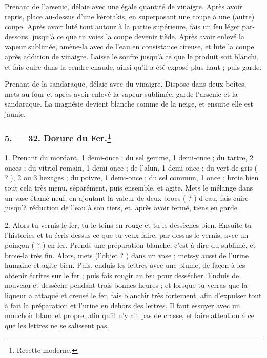 \documentclass[a4paper, 11pt, oneside, polutonikogreek, french]{article}
\begin{document}
Prenant de l'arsenic, délaie avec une égale quantité de vinaigre. Après avoir repris, place au-dessus d'une kérotakis, en superposant une coupe à une (autre) coupe. Après avoir luté tout autour à la partie supérieure, fais un feu léger par-dessous, jusqu'à ce que tu voies la coupe devenir tiède. Après avoir enlevé la vapeur sublimée, amène-la avec de l'eau en consistance cireuse, et lute la coupe après addition de vinaigre. Laisse le soufre jusqu'à ce que le produit soit blanchi, et fais cuire dans la cendre chaude, ainsi qu'il a été exposé plus haut ; puis garde.

Prenant de la sandaraque, délaie avec du vinaigre. Dispose dans deux boîtes, mets au four et après avoir enlevé la vapeur sublimée, garde l'arsenic et la sandaraque. La magnésie devient blanche comme de la neige, et ensuite elle est jaunie.

\bigskip
\centerline{\EightStarTaper}
\centerline{\EightStarTaper\EightStarTaper}
\bigskip

\subsubsection[5. --- 32. Dorure du Fer.]{5. --- 32. Dorure du Fer.\footnote{Recette moderne.}}

1. Prenant du mordant, 1 demi-once ; du sel gemme, 1 demi-once ; du tartre, 2 onces ; du vitriol romain, 1 demi-once ; de l'alun, 1 demi-once ; du vert-de-gris ( ? ), 2 ou 3 hexages ; du poivre, 1 demi-once ; du sel commun, 1 once ; broie bien tout cela très menu, séparément, puis ensemble, et agite. Mets le mélange dans un vase étamé neuf, en ajoutant la valeur de deux brocs ( ? ) d'eau, fais cuire jusqu'à réduction de l'eau à son tiers, et, après avoir fermé, tiens en garde.

2. Alors tu vernis le fer, tu le teins en rouge et tu le dessèches bien. Ensuite tu l'histories et tu écris dessus ce que tu veux faire, par-dessus le vernis, avec un poinçon ( ? ) en fer. Prends une préparation blanche, c'est-à-dire du sublimé, et broie-la très fin. Alors, mets (l'objet ? ) dans un vase ; mets-y aussi de l'urine humaine et agite bien. Puis, enduis les lettres avec une plume, de façon à les obtenir écrites sur le fer ; puis fais rougir au feu pour dessécher. Enduis de nouveau et dessèche pendant trois bonnes heures ; et lorsque tu verras que la liqueur a attaqué et creusé le fer, fais blanchir très fortement, afin d'expulser tout à fait la préparation et l'urine en dehors des lettres. Il faut essuyer avec un mouchoir blanc et propre, afin qu'il n'y ait pas de crasse, et faire attention à ce que les lettres ne se salissent pas.
\end{document}
